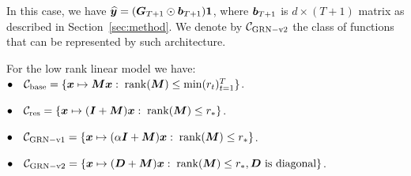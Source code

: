  In this case, we have $\widehat{\bm{y}} = ({\bm{G}}_{T+1}\odot\bm{b}_{T+1}) \boldsymbol{1}$, where $\bm{b}_{T+1}$ is $d\times (T+1)$ matrix as described in Section~\ref{sec:method}. We denote by $\mathcal{C}_{{\rm GRN-v2{}}}$ the class of functions that can be represented by such architecture.
%
\begin{theorem}\label{thm:expressive}
For the low rank linear model we have:
     $\bullet \quad \mathcal{C}_{{\rm base}} = \{\bm{x}\mapsto{\bm{M}}\bm{x}: \; \operatorname{rank}({\bm{M}})\le \min(r_t)_{t=1}^T\}$.
     
     $\bullet \quad \mathcal{C}_{{\rm res}} = \{\bm{x} \mapsto(\bm{I}+{\bm{M}})\bm{x}:\; \operatorname{rank}({\bm{M}})\le r_*\}$.
     
    $\bullet \quad \mathcal{C}_{{\rm GRN-v1{}}} = \{\bm{x} \mapsto(\alpha\bm{I}+{\bm{M}})\bm{x}:\; \operatorname{rank}({\bm{M}})\le r_*\}$.
    
    $\bullet \quad \mathcal{C}_{{\rm GRN-v2{}}} = \{\bm{x} \mapsto({\bm{D}}+{\bm{M}})\bm{x}:\; \operatorname{rank}({\bm{M}})\le r_*, {\bm{D}} \text{ is diagonal}\}$.
\end{theorem}
 

%

